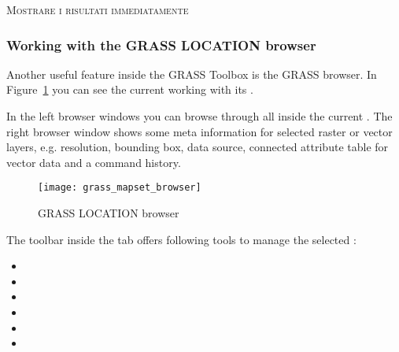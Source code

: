 \begin{Tip}\caption{\textsc{Mostrare i risultati immediatamente}}
\end{Tip} 

\subsubsection{Working with the GRASS LOCATION browser} 

Another useful feature inside the GRASS Toolbox is the GRASS 
 browser. In Figure~\ref{fig:grass_mapset_browser} you 
can see the current working  with its .

In the left browser windows you can browse through all  
inside the current . The right browser window shows some 
meta information for selected raster or vector layers, e.g. resolution, 
bounding box, data source, connected attribute table for vector data and a 
command history.

\begin{figure}[h]
 \begin{center}
 \caption{GRASS LOCATION browser \nixcaption}\label{fig:grass_mapset_browser}
 \texttt{[image: grass\_mapset\_browser]}
 \end{center}
\end{figure}

The toolbar inside the  tab offers following tools to manage 
the selected :

\begin{itemize}
\item {}
\item {}
\item {}
\item {}
\item {}
\item {}
\end{itemize}

